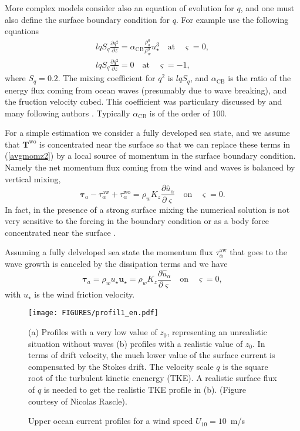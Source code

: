 More complex models consider also an equation of evolution for $q$,  and one must also define the surface boundary
condition for $q$. For example  \cite{Mellor&Yamada1982} use the following equations
\begin{eqnarray}
l q S_q \frac{\partial q^2}{\partial z}  =  \alpha_{\mathrm{CB}} \frac{\rho_a^0}{\rho_w^0}
u_\star^3  \quad \textrm{at} \quad \varsigma =
0, \label{surfq} \\
l q S_q \frac{\partial q^2}{\partial z}  =0 \quad \textrm{at} \quad \varsigma =
-1,
\end{eqnarray}
where $S_q=0.2$. The mixing coefficient for $q^2$ is  $l q S_q$, and 
$\alpha_{\mathrm{CB}}$ is the ratio of the energy flux coming from ocean waves (presumably due to wave breaking), and the fruction velocity cubed. 
This coefficient was particulary discussed by \cite{Craig&Banner1994} and many following authors 
\citep{Terray&al.2000,Mellor&Blumberg2004,Rascle&Ardhuin2009,Rascle&Ardhuin2013}. 
Typically $\alpha_{\mathrm{CB}}$ is of the order of  $100$.

For a simple estimation we consider a fully developed sea state, and we assume that   ${\mathbf
T}^{\mathrm{wo}}$ is concentrated near the surface so that  
we can replace these terms in 
(\ref{avgmomz2}) by a local source of momentum in the surface boundary condition. Namely the net momentum flux coming from the wind and waves is balanced by vertical mixing, 
\begin{equation}
{\mathbf \tau}_a - \tau_{\alpha}^{\mathrm{aw}} + \tau_{\alpha}^{\mathrm{wo}}=
 \rho_w K_z \frac{\partial
\widehat{u}_\alpha}{\partial \varsigma} \quad \textrm{on} \quad \varsigma =0.  \label{surfstress3}
\end{equation}
In fact, in the presence of a strong surface mixing the numerical solution is not very sensitive to the forcing in the boundary condition 
or as a body force concentrated near the surface \citep{Rascle&al.2013}. 

Assuming a fully delveloped sea state the momentum flux $\tau_{\alpha}^{\mathrm{aw}} $  that goes to the wave growth is canceled 
by the dissipation terms and we have
\begin{equation}
{\mathbf \tau}_a  = \rho_w u_\star {\mathbf u}_\star = \rho_w K_z
\frac{\partial \widehat{u}_\alpha}{\partial \varsigma} \quad \textrm{on} \quad
\varsigma = 0, \label{surfstress4}
\end{equation}
with $u_\star$ is the wind friction velocity.

\begin{figure}
\centerline{\texttt{[image: FIGURES/profil1\_en.pdf]}}
  \caption{Upper ocean current profiles for a wind speed $U_{10}=10$~m/s}
 {(a) Profiles with a very low value of $z_0$, representing an unrealistic situation without waves 
  (b) profiles with a realistic value of $z_0$. In terms of drift velocity, the much lower value of the surface current is compensated 
  by the Stokes drift.  The velocity scale $q$ is the square root of the turbulent kinetic enenergy (TKE). A realistic surface flux of $q$ is
  needed to get the realistic TKE profile in (b).  (Figure courtesy  of Nicolas Rascle).} \label{fig:2}
\end{figure}

